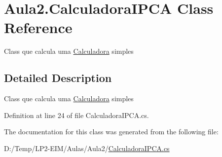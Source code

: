 \hypertarget{class_aula2_1_1_calculadora_i_p_c_a}{}\section{Aula2.\+Calculadora\+I\+P\+CA Class Reference}
\label{class_aula2_1_1_calculadora_i_p_c_a}


Class que calcula uma \mbox{\hyperlink{class_aula2_1_1_calculadora}{Calculadora}} simples  




\subsection{Detailed Description}
Class que calcula uma \mbox{\hyperlink{class_aula2_1_1_calculadora}{Calculadora}} simples 



Definition at line 24 of file Calculadora\+I\+P\+C\+A.\+cs.



The documentation for this class was generated from the following file\+:\begin{DoxyCompactItemize}
\item 
D\+:/\+Temp/\+L\+P2-\/\+E\+I\+M/\+Aulas/\+Aula2/\mbox{\hyperlink{_calculadora_i_p_c_a_8cs}{Calculadora\+I\+P\+C\+A.\+cs}}\end{DoxyCompactItemize}
